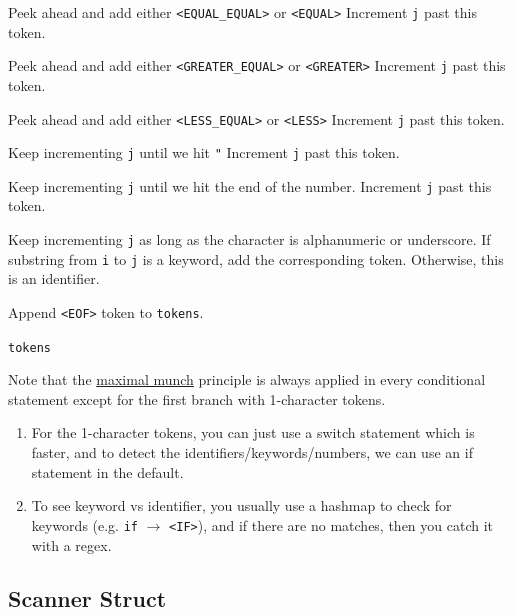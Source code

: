 \begin{algo}[Scanner]
\begin{algorithmic}[1]
						\State Peek ahead and add either \texttt{<EQUAL\_EQUAL>} or \texttt{<EQUAL>}
						\State Increment \texttt{j} past this token. 

						\State Peek ahead and add either \texttt{<GREATER\_EQUAL>} or \texttt{<GREATER>}
						\State Increment \texttt{j} past this token. 

						\State Peek ahead and add either \texttt{<LESS\_EQUAL>} or \texttt{<LESS>}
						\State Increment \texttt{j} past this token. 

						\State Keep incrementing \texttt{j} until we hit \texttt{"}
						\State Increment \texttt{j} past this token. 

						\State Keep incrementing \texttt{j} until we hit the end of the number. 
						\State Increment \texttt{j} past this token. 

						\State Keep incrementing \texttt{j} as long as the character is alphanumeric or underscore. 
						\State If substring from \texttt{i} to \texttt{j} is a keyword, add the corresponding token. 
						\State Otherwise, this is an identifier. 
					\EndIf 
				\EndWhile

				\State Append \texttt{<EOF>} token to \texttt{tokens}. 
				
				\State \Return \texttt{tokens}
			\EndProcedure
		\end{algorithmic}

		Note that the \hyperref[def:maximal-munch]{maximal munch} principle is always applied in every conditional statement except for the first branch with 1-character tokens. 

		\begin{enumerate}
		  \item For the 1-character tokens, you can just use a switch statement which is faster, and to detect the identifiers/keywords/numbers, we can use an if statement in the default. 
			\item To see keyword vs identifier, you usually use a hashmap to check for keywords (e.g. \texttt{if} $\to$ \texttt{<IF>}), and if there are no matches, then you catch it with a regex. 
		\end{enumerate}
  \end{algo}

\subsection{Scanner Struct}

